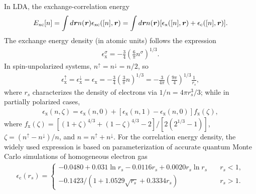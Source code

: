 In LDA, the exchange-correlation energy 
\begin{equation}\label{spExclda}
\begin{aligned}
E_\text{xc}[n]
=\int d\textbf{\textit r} n(\textbf{\textit r})\epsilon_\text{xc}([n],\textbf{\textit r})
=\int d\textbf{\textit r} n(\textbf{\textit r})[\epsilon_\text{x}([n],\textbf{\textit r})+\epsilon_\text{c}([n],\textbf{\textit r})].
\end{aligned}
\end{equation}
The exchange energy density (in atomic units) follows the expression \cite{martin-esbook}
\begin{equation}\label{ldaxs1}
\begin{aligned}
\epsilon_\text{x}^\sigma=-\frac{3}{4}\left(\frac{6}{\pi}n^\sigma\right)^{1/3}.
\end{aligned}
\end{equation}
In spin-unpolarized systems, $n^\uparrow=n^\downarrow=n/2$, so
\begin{equation}\label{ldaxs0}
\begin{aligned}
\epsilon_\text{x}^\uparrow=\epsilon_\text{x}^\downarrow=\epsilon_\text{x}
=-\frac{3}{4}\left(\frac{3}{\pi}n\right)^{1/3}
=-\frac{3}{4\pi}\left(\frac{9\pi}{4}\right)^{1/3}\frac{1}{r_s},
\end{aligned}
\end{equation}
where $r_s$ characterizes the density of electrons via $1/n=4\pi r_s^3/3$; 
while in partially polarized cases,
\begin{equation}\label{ldaxs2}
\begin{aligned}
\epsilon_\text{x}(n,\zeta)=\epsilon_\text{x}(n,0)+[\epsilon_\text{x}(n,1)-\epsilon_\text{x}(n,0)]f_\text{x}(\zeta),
\end{aligned}
\end{equation}
where $f_\text{x}(\zeta)=[(1+\zeta)^{4/3}+(1-\zeta)^{4/3}-2]/[2(2^{1/3}-1)]$,
$\zeta=(n^\uparrow-n^\downarrow)/n$, and $n=n^\uparrow+n^\downarrow$. For the
correlation energy density, the widely used expression is based on parameterization
\cite{Perdew1981} of accurate quantum Monte Carlo simulations of homogeneous electron gas \cite{Ceperley1980}
\begin{equation}\label{ldaccapz}
\begin{aligned}
\epsilon_\text{c}(r_s)=
\begin{cases}
-0.0480 + 0.031 \ln r_s - 0.0116r_s + 0.0020 r_s\ln r_s & \quad r_s < 1, \\
-0.1423/(1+1.0529\sqrt{r_s}+0.3334r_s) & \quad r_s > 1.
\end{cases}
\end{aligned}
\end{equation}


